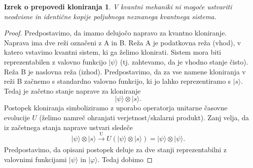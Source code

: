 \documentclass[12pt]{article}
\newtheorem*{remark}{Izrek o prepovedi kloniranja}
\begin{document}
 
\begin{remark} V kvantni mehaniki ni mogoče ustvariti neodvisne in identične kopije poljubnega neznanega kvantnega sistema. 
\end{remark}

\begin{proof}
Predpostavimo, da imamo delujočo napravo za kvantno kloniranje. Naprava ima dve reži označeni z A in B. Reža A je podatkovna reža (vhod), v katero vstavimo kvantni sistem, ki ga želimo klonirati. Sistem mora biti reprezentabilen z valovno funkcijo $| \psi \rangle$ (tj. zahtevamo, da je vhodno stanje čisto). Reža B je naslovna reža (izhod). Predpostavimo, da za vse namene kloniranja v reži B začnemo s standardno valovno funkcijo, ki jo lahko reprezentiramo s $| s \rangle$. Tedaj je začetno stanje naprave za kloniranje
\begin{equation}
| \psi \rangle \otimes | s \rangle.
\end{equation}
Postopek kloniranja simboliziramo z uporabo operatorja unitarne časovne evolucije $U$ (želimo namreč ohranjati verjetnost/skalarni produkt). Zanj velja, da iz začetnega stanja naprave ustvari sledeče
\begin{equation}
| \psi \rangle \otimes | s \rangle \xrightarrow[\text{}]{\text{U}} U(| \psi \rangle \otimes | s \rangle) = | \psi \rangle \otimes | \psi \rangle.
\end{equation}
Predpostavimo, da opisani postopek deluje za dve stanji reprezentabilni z valovnimi funkcijami $| \psi \rangle$ in $| \varphi \rangle$. Tedaj dobimo 


\end{proof}
\end{document}
